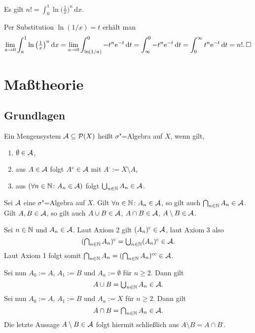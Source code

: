 \begin{Satz}
Es gilt $n! = \int_0^1 \ln\big(\frac{1}{x}\big)^n\,\mathrm dx$.
\end{Satz}
\begin{Beweis}
Per Substitution $\ln(1/x)=t$ erhält man
\[
\lim_{a\to 0}\int_a^1 \ln\big(\tfrac{1}{x}\big)^n\,\mathrm dx
= \lim_{a\to 0}\int_{\ln(1/a)}^0 -t^n\mathrm e^{-t}\,\mathrm dt
= \int_\infty^0 -t^n\mathrm e^{-t}\,\mathrm dt = \int_0^\infty t^n\mathrm e^{-t}\,\mathrm dt
= n!.\,\square
\]
\end{Beweis}

\newpage
\section{Maßtheorie}

\subsection{Grundlagen}

\begin{Definition}\label{def:sigma-algebra}\newlinefirst
Ein Mengensystem $\mathcal{A}\subseteq\mathcal P(X)$ heißt $\sigma$"=Algebra auf
$X$, wenn gilt,
\begin{enumerate}\setlength{\parskip}{0pt}
\item $\emptyset\in\mathcal{A}$,
\item aus $A\in\mathcal{A}$ folgt $A^\mathrm c\in\mathcal{A}$ mit $A^\comp := X\setminus A$,
\item aus $(\forall n\in\mathbb N\colon A_n\in\mathcal{A})$ folgt
$\bigcup_{n\in\mathbb N} A_n\in\mathcal{A}$.
\end{enumerate}
\end{Definition}

\begin{Satz}
Sei $\mathcal{A}$ eine $\sigma$"=Algebra auf $X$. Gilt $\forall n\in\mathbb N\colon A_n\in\mathcal{A}$,
so gilt auch $\bigcap_{n\in\mathbb N} A_n\in\mathcal{A}$. Gilt $A,B\in\mathcal{A}$,
so gilt auch $A\cup B\in\mathcal{A}$, $A\cap B\in\mathcal{A}$,
$A\setminus B\in\mathcal{A}$.
\end{Satz}
\begin{Beweis}
Sei $n\in\mathbb N$ und $A_n\in\mathcal{A}$. Laut Axiom 2 gilt $(A_n)^\mathrm c\in\mathcal{A}$, laut Axiom 3 also
\[\textstyle (\bigcap_{n\in\mathbb N} A_n)^\mathrm c = \bigcup_{n\in\mathbb N} (A_n)^\mathrm c\in\mathcal{A}.\]
Laut Axiom 1 folgt somit $\bigcap_{n\in\mathbb N} A_n = (\bigcap_{n\in\mathbb N} A_n)^{\mathrm c\mathrm c}\in\mathcal{A}$.

Sei nun $A_0:=A$, $A_1:=B$ und $A_n:=\emptyset$ für $n\ge 2$. Dann gilt
\[\textstyle A\cup B = \bigcup_{n\in\mathbb N} A_n\in\mathcal{A}.\]
Sei nun $A_0:=A$, $A_1:=B$ und $A_n:=X$ für $n\ge 2$. Dann gilt
\[\textstyle A\cap B = \bigcap_{n\in\mathbb N} A_n\in\mathcal{A}.\]
Die letzte Aussage $A\setminus B\in\mathcal{A}$ folgt hiermit schließlich aus
$A\setminus B = A\cap B^\comp$.\,\qedsymbol
\end{Beweis}

